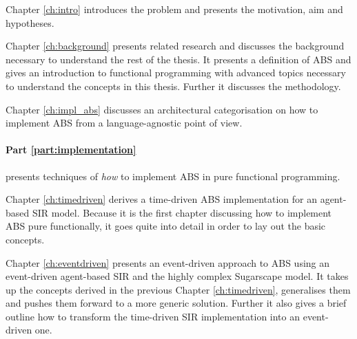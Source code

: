 Chapter \ref{ch:intro} introduces the problem and presents the motivation, aim and hypotheses.

\medskip

Chapter \ref{ch:background} presents related research and discusses the background necessary to understand the rest of the thesis. It presents a definition of ABS and gives an introduction to functional programming with advanced topics necessary to understand the concepts in this thesis. Further it discusses the methodology.

\medskip

Chapter \ref{ch:impl_abs} discusses an architectural categorisation on how to implement ABS from a language-agnostic point of view. 

\medskip

\paragraph{Part \ref{part:implementation}} presents techniques of \textit{how} to implement ABS in pure functional programming. 
\medskip

Chapter \ref{ch:timedriven} derives a time-driven ABS implementation for an agent-based SIR model. Because it is the first chapter discussing how to implement ABS pure functionally, it goes quite into detail in order to lay out the basic concepts.

\medskip

Chapter \ref{ch:eventdriven} presents an event-driven approach to ABS using an event-driven agent-based SIR and the highly complex Sugarscape model. It takes up the concepts derived in the previous Chapter \ref{ch:timedriven}, generalises them and pushes them forward to a more generic solution. Further it also gives a brief outline how to transform the time-driven SIR implementation into an event-driven one.



